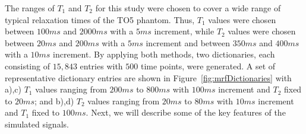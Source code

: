 The ranges of $T_1$ and $T_2$ for this study were chosen to cover a wide range of typical relaxation times of the TO5 phantom.
Thus, $T_1$ values were chosen between $100ms$ and $2000ms$ with a $5ms$ increment, while
$T_2$ values were chosen between $20ms$ and $200ms$ with a $5ms$ increment and between $350ms$ and $400ms$ with a $10ms$ increment.
By applying both methods, two dictionaries, each consisting of $15,843$ entries with $500$ time points, were generated.
A set of representative dictionary entries are shown in Figure~\ref{fig:mrfDictionaries} with a),c) $T_1$ values ranging from $200ms$ to $800ms$ with $100ms$ increment and $T_2$ fixed to $20ms$; and b),d) $T_2$ values ranging from $20ms$ to $80ms$ with $10ms$ increment and $T_1$ fixed to $100ms$.
Next, we will describe some of the key features of the simulated signals.

